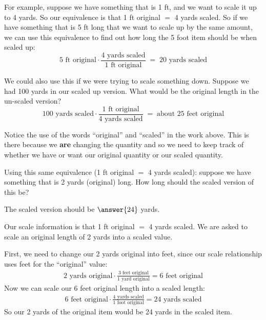 \documentclass[12pt]{ximera}
\begin{document}
For example, suppose we have something that is 1 ft, and we want to scale it up to 4
yards. So our equivalence is that 1 ft original $=$ 4 yards scaled. So if we have
something that is 5 ft long that we want to scale up by the same amount, we can use
this equivalence to find out how long the 5 foot item should be when scaled up:
\[
5\text{ ft original} \cdot \frac{4\text{ yards scaled}}{1\text{ ft original}} \;=\; 20\text{ yards scaled}
\]

We could also use this if we were trying to scale something down. Suppose we had 100
yards in our scaled up version. What would be the original length in the un-scaled
version?
\[
100\text{ yards scaled} \cdot \frac{1\text{ ft original}}{4\text{ yards scaled}} \;=\; \text{about } 25\text{ feet original}
\]

Notice the use of the words ``original'' and ``scaled'' in the work above. This is there
because we \textbf{are} changing the quantity and so we need to keep track of whether we
have or want our original quantity or our scaled quantity.

\begin{problem}
Using this same equivalence (1 ft original $=$ 4 yards scaled): suppose we have
something that is 2 yards (original) long. How long should the scaled version of this
be?

The scaled version should be $\answer{24}$ yards.

\begin{freeResponse}
\end{freeResponse}

\begin{solution}
Our scale information is that 1 ft original $=$ 4 yards scaled. We are asked to scale an
original length of 2 yards into a scaled value.

First, we need to change our 2 yards original into feet, since our scale relationship
uses feet for the ``original'' value:
\begin{gather*}
2\text{ yards original} \cdot \frac{3\text{ feet original}}{1\text{ yard original}} = 6\text{ feet original}
\end{gather*}
Now we can scale our 6 feet original length into a scaled length:
\begin{gather*}
6\text{ feet original} \cdot \frac{4\text{ yards scaled}}{1\text{ foot original}} = 24\text{ yards scaled}
\end{gather*}
So our 2 yards of the original item would be 24 yards in the scaled item.
\end{solution}
\end{problem}
\end{document}
